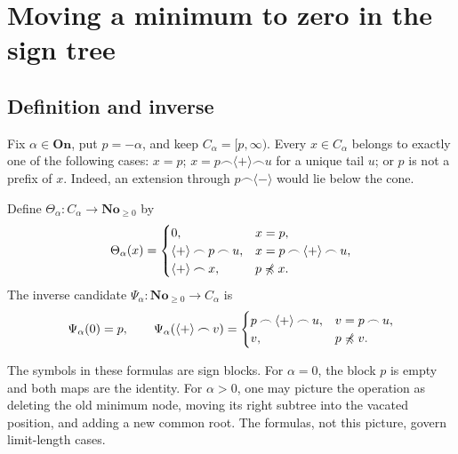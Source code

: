 \documentclass[11pt]{article}
\theoremstyle{definition}
\theoremstyle{remark}
\newcommand{\No}{\ensuremath{\mathbf{No}}}
\newcommand{\On}{\ensuremath{\mathbf{On}}}
\newcommand{\cat}{\mathbin{\frown}}
\newcommand{\plus}{\langle+\rangle}
\newcommand{\minus}{\langle-\rangle}
\newcommand{\pre}{\mathrel{\preccurlyeq}}
\newcommand{\tht}{\Theta_{\alpha}}
\newcommand{\psiA}{\Psi_{\alpha}}
\begin{document}
\section{Moving a minimum to zero in the sign tree}\label{isg:sec:surgery}

\subsection{Definition and inverse}
Fix $\alpha\in\On$, put $p=-\alpha$, and keep
$C_\alpha=[p,\infty)$. Every $x\in C_\alpha$ belongs to exactly one of
the following cases: $x=p$; $x=p\cat\plus\cat u$ for a unique tail
$u$; or $p$ is not a prefix of $x$.
Indeed, an extension through $p\cat\minus$ would lie below the cone.

\begin{definition}\label{isg:def:theta}
Define $\tht:C_\alpha\to\No_{\ge0}$ by
\begin{equation}\label{isg:eq:theta}
 \tht(x)=
 \begin{cases}
  0, & x=p,\\
  \plus\cat p\cat u, & x=p\cat\plus\cat u,\\
  \plus\cat x, & p\not\pre x.
 \end{cases}
\end{equation}
The inverse candidate $\psiA:\No_{\ge0}\to C_\alpha$ is
\begin{equation}\label{isg:eq:psi}
 \psiA(0)=p,\qquad
 \psiA(\plus\cat v)=
 \begin{cases}
  p\cat\plus\cat u,&v=p\cat u,\\
  v,&p\not\pre v.
 \end{cases}
\end{equation}
\end{definition}

The symbols in these formulas are sign blocks. For $\alpha=0$, the block
$p$ is empty and both maps are the identity. For $\alpha>0$, one may
picture the operation as deleting the old minimum node, moving its
right subtree into the vacated position, and adding a new common root.
The formulas, not this picture, govern limit-length cases.
\end{document}
